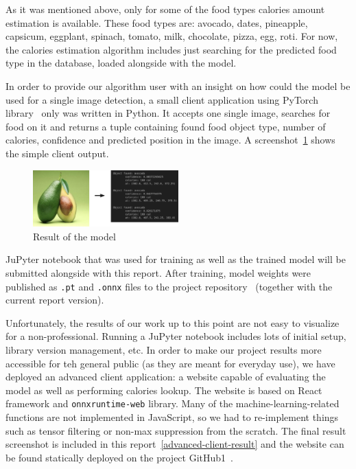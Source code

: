 \documentclass[10pt,twocolumn,letterpaper]{article}
\begin{document}
As it was mentioned above, only for some of the food types calories amount estimation is available.
These food types are: avocado, dates, pineapple, capsicum, eggplant, spinach, tomato, milk, chocolate, pizza, egg, roti.
For now, the calories estimation algorithm includes just searching for the predicted food type in the database, loaded alongside with the model.

In order to provide our algorithm user with an insight on how could the model be used for a single image detection, a small client application using PyTorch library~\cite{torchlibrary} only was written in Python.
It accepts one single image, searches for food on it and returns a tuple containing found food object type, number of calories, confidence and predicted position in the image.
A screenshot~\ref{simple-client-result} shows the simple client output.

\begin{figure}[htbp]
    \centering
    \includegraphics[width=0.5\textwidth]{simple-detector.png}
    \caption{Result of the model}\label{simple-client-result}
\end{figure}

JuPyter notebook that was used for training as well as the trained model will be submitted alongside with this report.
After training, model weights were published as \texttt{.pt} and \texttt{.onnx} files to the project repository~\cite{projectRepo} (together with the current report version).

Unfortunately, the results of our work up to this point are not easy to visualize for a non-professional.
Running a JuPyter notebook includes lots of initial setup, library version management, etc.
In order to make our project results more accessible for teh general public (as they are meant for everyday use), we have deployed an advanced client application: a website capable of evaluating the model as well as performing calories lookup.
The website is based on React framework and \texttt{onnxruntime-web} library.
Many of the machine-learning-related functions are not implemented in JavaScript, so we had to re-implement things such as tensor filtering or non-max suppression from the scratch.
The final result screenshot is included in this report~\ref{advanced-client-result} and the website can be found statically deployed on the project GitHub1~\cite{projectWebsite}.
\end{document}
